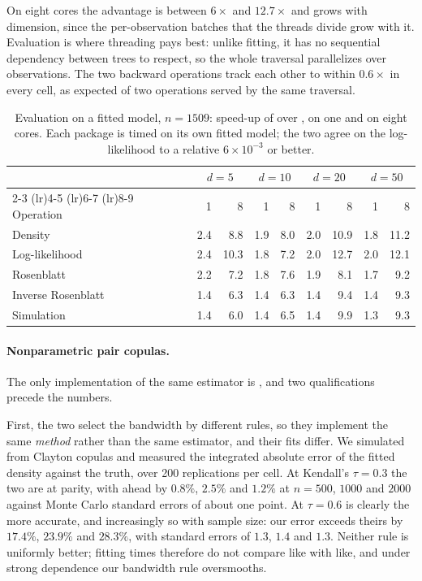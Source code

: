 \documentclass[article]{jss}
\begin{document}
On eight cores the advantage is between $6\times$ and $12.7\times$ and grows with
dimension, since the per-observation batches that the threads divide grow with
it.  Evaluation is where threading pays best: unlike fitting, it has no
sequential dependency between trees to respect, so the whole traversal
parallelizes over observations.  The two backward operations track each other to within $0.6\times$ in every
cell, as expected of two operations served by the same traversal.

\begin{table}[t!]
\centering
\small
\begin{tabular}{lrrrrrrrr}
\toprule
& \multicolumn{2}{c}{$d = 5$} & \multicolumn{2}{c}{$d = 10$}
& \multicolumn{2}{c}{$d = 20$} & \multicolumn{2}{c}{$d = 50$} \\
\cmidrule(lr){2-3} \cmidrule(lr){4-5} \cmidrule(lr){6-7} \cmidrule(lr){8-9}
Operation & 1 & 8 & 1 & 8 & 1 & 8 & 1 & 8 \\
\midrule
Density              & 2.4 &  8.8 & 1.9 & 8.0 & 2.0 & 10.9 & 1.8 & 11.2 \\
Log-likelihood       & 2.4 & 10.3 & 1.8 & 7.2 & 2.0 & 12.7 & 2.0 & 12.1 \\
Rosenblatt           & 2.2 &  7.2 & 1.8 & 7.6 & 1.9 &  8.1 & 1.7 &  9.2 \\
Inverse Rosenblatt   & 1.4 &  6.3 & 1.4 & 6.3 & 1.4 &  9.4 & 1.4 &  9.3 \\
Simulation           & 1.4 &  6.0 & 1.4 & 6.5 & 1.4 &  9.9 & 1.3 &  9.3 \\
\bottomrule
\end{tabular}
\caption{Evaluation on a fitted model, $n = 1509$: speed-up of
 over , on one and on eight cores.  Each
package is timed on its own fitted model; the two agree on the log-likelihood
to a relative $6 \times 10^{-3}$ or better.}
\label{tab:evaluation}
\end{table}

\paragraph{Nonparametric pair copulas.}  The only  implementation
of the same estimator is  \citep{nagler2018jss}, and two
qualifications precede the numbers.

First, the two select the bandwidth by different rules, so they implement the
same \emph{method} rather than the same estimator, and their fits differ.  We
simulated from Clayton copulas and measured the integrated absolute error of
the fitted density against the truth, over 200 replications per cell.  At
Kendall's $\tau = 0.3$ the two are at parity, with  ahead by
$0.8\%$, $2.5\%$ and $1.2\%$ at $n = 500$, $1000$ and $2000$ against Monte
Carlo standard errors of about one point.  At $\tau = 0.6$  is
clearly the more accurate, and increasingly so with sample size: our error
exceeds theirs by $17.4\%$, $23.9\%$ and $28.3\%$, with standard errors of
$1.3$, $1.4$ and $1.3$.  Neither rule is uniformly better; fitting times
therefore do not compare like with like, and under strong dependence our
bandwidth rule oversmooths.
\end{document}
